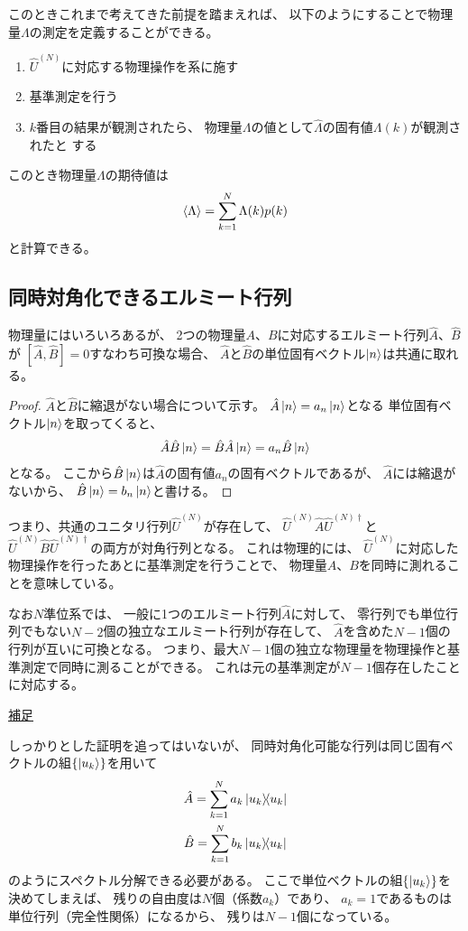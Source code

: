 \documentclass[a4paper, 10pt]{jsarticle}
\begin{document}
このときこれまで考えてきた前提を踏まえれば、
以下のようにすることで物理量$\Lambda$の測定を定義することができる。
\begin{enumerate}
	\item $\hat{U}^{(N)}$に対応する物理操作を系に施す
	\item 基準測定を行う
	\item $k$番目の結果が観測されたら、
	物理量$\Lambda$の値として$\hat{\Lambda}$の固有値$\Lambda(k)$が観測されたと
	する
\end{enumerate}

このとき物理量$\Lambda$の期待値は
\begin{align}
	\Braket{\Lambda} = \sum_{k=1}^N \Lambda(k) p(k)
\end{align}
と計算できる。

\subsection{同時対角化できるエルミート行列}
物理量にはいろいろあるが、
2つの物理量$A$、$B$に対応するエルミート行列$\hat{A}$、$\hat{B}$が
$[\hat{A}, \hat{B}] = 0$すなわち可換な場合、
$\hat{A}$と$\hat{B}$の単位固有ベクトル$\Ket{n}$は共通に取れる。
\begin{proof}
	$\hat{A}$と$\hat{B}$に縮退がない場合について示す。
	$\hat{A} \Ket{n} = a_n \Ket{n}$となる
	単位固有ベクトル$\Ket{n}$を取ってくると、
	\begin{align}
		\hat{A} \hat{B} \Ket{n} = \hat{B} \hat{A} \Ket{n}
		= a_n \hat{B} \Ket{n}
	\end{align}
	となる。
	ここから$\hat{B} \Ket{n}$は$\hat{A}$の固有値$a_n$の固有ベクトルであるが、
	$\hat{A}$には縮退がないから、
	$\hat{B} \Ket{n} = b_n \Ket{n}$と書ける。
\end{proof}
つまり、共通のユニタリ行列$\hat{U}^{(N)}$が存在して、
$\hat{U}^{(N)} \hat{A} \hat{U}^{(N)\dagger}$と
$\hat{U}^{(N)} \hat{B} \hat{U}^{(N)\dagger}$の両方が対角行列となる。
これは物理的には、
$\hat{U}^{(N)}$に対応した物理操作を行ったあとに基準測定を行うことで、
物理量$A$、$B$を同時に測れることを意味している。

なお$N$準位系では、
一般に1つのエルミート行列$\hat{A}$に対して、
零行列でも単位行列でもない$N-2$個の独立なエルミート行列が存在して、
$\hat{A}$を含めた$N-1$個の行列が互いに可換となる。
つまり、最大$N-1$個の独立な物理量を物理操作と基準測定で同時に測ることができる。
これは元の基準測定が$N-1$個存在したことに対応する。
\begin{tcolorbox}[
enhanced,
colback = white,
boxrule = 0.5pt,
arc=2mm,
breakable
]
	\underline{補足}

	しっかりとした証明を追ってはいないが、
	同時対角化可能な行列は同じ固有ベクトルの組$\{\Ket{u_k}\}$を用いて
	\begin{gather}
		\hat{A} = \sum_{k=1}^N a_k \Ket{u_k} \! \! \Bra{u_k} \\
		\hat{B} = \sum_{k=1}^N b_k \Ket{u_k} \! \! \Bra{u_k}
	\end{gather}
	のようにスペクトル分解できる必要がある。
	ここで単位ベクトルの組$\{\Ket{u_k}\}$を決めてしまえば、
	残りの自由度は$N$個（係数$a_k$）であり、
	$a_k = 1$であるものは単位行列（完全性関係）になるから、
	残りは$N-1$個になっている。
\end{tcolorbox}
\end{document}
